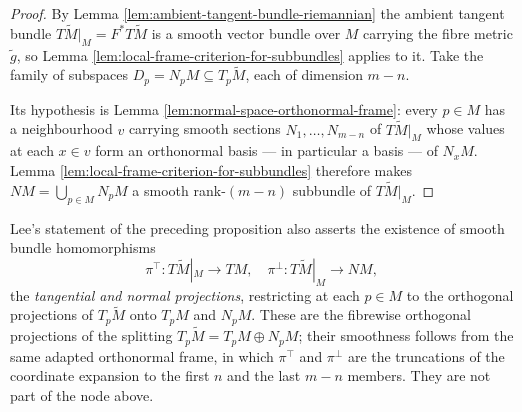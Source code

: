 \begin{proof}
\leanok
{}
By Lemma \ref{lem:ambient-tangent-bundle-riemannian} the ambient tangent bundle $T\tilde M|_M = F^*T\tilde M$ is a smooth vector bundle over $M$ carrying the fibre metric $\tilde g$, so Lemma \ref{lem:local-frame-criterion-for-subbundles} applies to it. Take the family of subspaces $D_p = N_p M \subseteq T_p\tilde M$, each of dimension $m - n$.

Its hypothesis is Lemma \ref{lem:normal-space-orthonormal-frame}: every $p \in M$ has a neighbourhood $v$ carrying smooth sections $N_1, \ldots, N_{m-n}$ of $T\tilde M|_M$ whose values at each $x \in v$ form an orthonormal basis --- in particular a basis --- of $N_x M$. Lemma \ref{lem:local-frame-criterion-for-subbundles} therefore makes $NM = \bigcup_{p \in M} N_p M$ a smooth rank-$(m-n)$ subbundle of $T\tilde M|_M$.
\end{proof}

\begin{remark}
\label{rem:normal-bundle-projections}
Lee's statement of the preceding proposition also asserts the existence of smooth bundle homomorphisms
\[
\pi^\top : T\tilde{M}|_M \to TM, \quad \pi^\perp : T\tilde{M}|_M \to NM,
\]
the \emph{tangential and normal projections}, restricting at each $p \in M$ to the orthogonal projections of $T_p\tilde M$ onto $T_p M$ and $N_p M$. These are the fibrewise orthogonal projections of the splitting $T_p\tilde M = T_p M \oplus N_p M$; their smoothness follows from the same adapted orthonormal frame, in which $\pi^\top$ and $\pi^\perp$ are the truncations of the coordinate expansion to the first $n$ and the last $m-n$ members. They are not part of the node above.
\end{remark}

